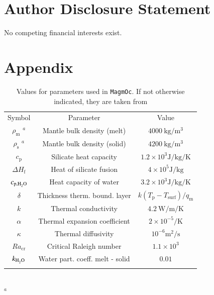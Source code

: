 \documentclass[oneside,twocolumn]{article}
\newcommand{\magmoc}{\texttt{\footnotesize{MagmOc}}}
\begin{document}
\section*{Author Disclosure Statement}
No competing financial interests exist.     




\onecolumn
\section*{Appendix}

\begin{table}[ht]
    \caption[Values model]{Values for parameters used in \magmoc{}. If not otherwise indicated, they are taken from \citet{Schaefer2016}}
    \begin{tabular}{ccc}
    	\noalign{\smallskip}
    	\hline
    	\noalign{\smallskip}
    	Symbol & Parameter & Value \\ 
    	\noalign{\smallskip}
    	\hline \hline
    	\noalign{\smallskip}
    	$\rho_\mathrm{m}$  ${}^{a}$ & Mantle bulk density (melt)& $\SI{4000}{\kilogram\per\cubic\metre}$\\
    	$\rho_\mathrm{s}$  ${}^{a}$ & Mantle bulk density (solid)& $\SI{4200}{\kilogram\per\cubic\metre}$\\
    	$c_\mathrm{p} $ & Silicate heat capacity & $1.2 \times 10^3 \si{\joule\per\kilogram\per\kelvin}$ \\
    	$\Delta H_\mathrm{f}$ & Heat of silicate fusion & $4 \times 10^5 \si{\joule\per\kilogram}$ \\
    	$c_{\mathrm{p},\ce{H2O}} $ & Heat capacity of water & $3.2 \times 10^3 \si{\joule\per\kilogram\per\kelvin}$\\
    	$\delta$ &Thickness therm. bound. layer & $k (T_\mathrm{p} - T_\mathrm{surf}) / q_\mathrm{m} $\\
    	$k$ & Thermal conductivity & $\SI{4.2}{\watt\per\metre\per\kelvin}$\\
    	$\alpha$ & Thermal expansion coefficient & $2 \times 10^{-5} \si{\per\kelvin}$ \\
    	$\kappa$ & Thermal diffusivity & $10^{-6} \si{\metre\squared\per\second}$ \\
    	$Ra_\mathrm{cr}$ & Critical Raleigh number & $1.1 \times 10^3$ \\
    	$k_{\ce{H2O}}$ & Water part. coeff. melt - solid & $0.01$\\
    	\noalign{\smallskip}
    	\hline
    \end{tabular}
    \\
    ${}^{a}$ \citet{Lebrun2013}
    \label{Tab_Therm_Model_Value}
\end{table}
\end{document}
